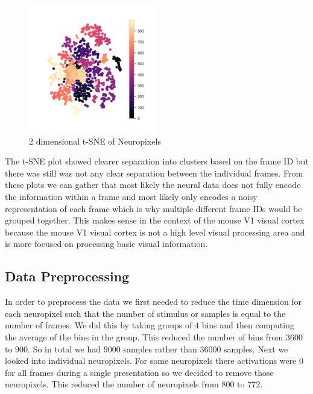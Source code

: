 \documentclass[12pt, letterpaper]{article}
\begin{document}
\begin{figure}[H]
    \centering
    \includegraphics[width=0.5\textwidth]{tsne_neuropixels.png}
    \caption{2 dimensional t-SNE of Neuropixels}
    \label{fig:2d_tsne_neuropixels}
\end{figure}


The t-SNE plot showed clearer separation into clusters based on the frame ID but there was still was not any clear separation between the individual frames. From these plots we can gather that most likely the neural data does not fully encode the information within a frame and most likely only encodes a noisy representation of each frame which is why multiple different frame IDs would be grouped together. This makes sense in the context of the mouse V1 visual cortex because the mouse V1 visual cortex is not a high level visual processing area and is more focused on processing basic visual information.

\subsection{Data Preprocessing}
In order to preprocess the data we first needed to reduce the time dimension for each neuropixel such that the number of stimulus or samples is equal to the number of frames. We did this by taking groups of $4$ bins and then computing the average of the bins in the group. This reduced the number of bins from $3600$ to $900$. So in total we had $9000$ samples rather than $36000$ samples. Next we looked into individual neuropixels. For some neuropixels there activations were $0$ for all frames during a single presentation so we decided to remove those neuropixels. This reduced the number of neuropixels from $800$ to $772$. 
\end{document}
